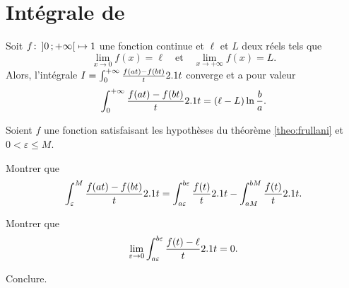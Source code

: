 \section{Intégrale de }




\begin{theo}\label{theo:frullani}
Soit $\fonctionligne[f]{\interoo{0}{+\infty}}{\R}$ une fonction continue et $\ell$ et $L$ deux réels tels que
\[
\lim_{x\to0} f(x) = \ell
\quad \text{et} \quad 
\lim_{x\to+\infty} f(x) = L.
\]
Alors, l'intégrale $I = \int_0^{+\infty} \frac{f(a t) - f(b t)}{t} \d t$ converge et a pour valeur
\[
\int_0^{+\infty} \frac{f(a t) - f(b t)}{t} \d t = (\ell - L) \ln\frac{b}{a}.
\]
\end{theo}

\begin{exercice}
Soient $f$ une fonction satisfaisant les hypothèses du théorème \ref{theo:frullani} et $0 < \varepsilon \leqslant M$.
\begin{questions}
\item Montrer que
\[
\int_\varepsilon^M \frac{f(a t) - f(b t)}{t} \d t
= \int_{a\varepsilon}^{b\varepsilon} \frac{f(t)}{t} \d t - \int_{a M}^{b M} \frac{f(t)}{t} \d t.
\]

\item Montrer que
\[
\lim_{\varepsilon \to 0} \int_{a\varepsilon}^{b\varepsilon} \frac{f(t) - \ell}{t} \d t = 0.
\]

\item Conclure.
\end{questions}
\end{exercice}

